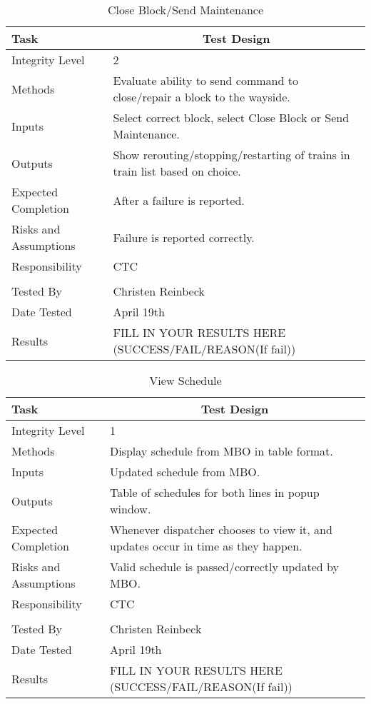 \documentclass[]{article}
\begin{document}
\begin{table}[H]
	\centering
	\caption{Close Block/Send Maintenance}
	\begin{tabular}{|l|l|}
		\hline
		Task & \multicolumn{1}{c|}{Test Design} \\ \hline
		Integrity Level & 2 \\ \hline
		Methods & \parbox[t]{10cm}{Evaluate ability to send command to close/repair a block to the wayside.}\\ \hline
		Inputs &  Select correct block, select Close Block or Send Maintenance. \\ \hline
		Outputs &  \parbox[t]{10cm}{Show rerouting/stopping/restarting of trains in train list based on choice.}\\ \hline
		Expected Completion & After a failure is reported.\\ \hline
		Risks and Assumptions & \parbox[t]{10cm}{Failure is reported correctly.} \\ \hline
		Responsibility & CTC\\ \hline
		\\ \hline
		Tested By   &  Christen Reinbeck\\	\hline
		Date Tested & \parbox[t]{10cm}{April 19th}\\ \hline
		Results & FILL IN YOUR RESULTS HERE (SUCCESS/FAIL/REASON(If fail))\\ \hline
	\end{tabular}
\end{table}

\begin{table}[H]
	\centering
	\caption{View Schedule}
	\begin{tabular}{|l|l|}
		\hline
		Task & \multicolumn{1}{c|}{Test Design} \\ \hline
		Integrity Level & 1 \\ \hline
		Methods & Display schedule from MBO in table format.\\ \hline
		Inputs &  Updated schedule from MBO. \\ \hline
		Outputs &  Table of schedules for both lines in popup window. \\ \hline
		Expected Completion & \parbox[t]{10cm}{Whenever dispatcher chooses to view it, and updates occur in time as they happen.}\\ \hline
		Risks and Assumptions & \parbox[t]{10cm}{Valid schedule is passed/correctly updated by MBO.} \\ \hline
		Responsibility & CTC\\ \hline
		\\ \hline
		Tested By   &  Christen Reinbeck\\	\hline
		Date Tested & \parbox[t]{10cm}{April 19th}\\ \hline
		Results & FILL IN YOUR RESULTS HERE (SUCCESS/FAIL/REASON(If fail))\\ \hline
	\end{tabular}
\end{table}
\end{document}
